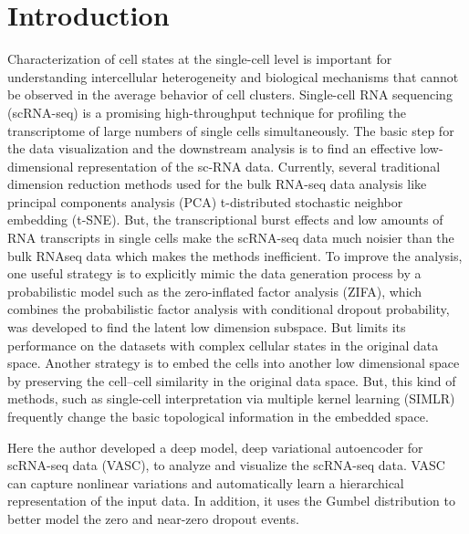 \documentclass[12 pts]{article}
\begin{document}



\tableofcontents
\clearpage

\section{Introduction}
Characterization of cell states at the single-cell level is important for understanding intercellular heterogeneity and biological mechanisms that cannot be observed in the average behavior of cell clusters. Single-cell RNA sequencing (scRNA-seq) is a promising high-throughput technique for profiling the transcriptome of large numbers of single cells simultaneously. The basic step for the data visualization and the downstream analysis is to find an effective low-dimensional representation of the sc-RNA data. Currently, several traditional dimension reduction methods used for the bulk RNA-seq data analysis like principal components analysis (PCA) t-distributed stochastic neighbor embedding (t-SNE). But, the transcriptional burst effects and low amounts of RNA transcripts in single cells make the scRNA-seq data much noisier than the bulk RNAseq data which makes the methods inefficient. To improve the analysis, one useful strategy is to explicitly mimic the data generation process by a probabilistic model such as the zero-inflated factor analysis (ZIFA), which combines the probabilistic factor analysis with conditional dropout probability, was developed to find the latent low dimension subspace. But limits its performance on the datasets with complex cellular states in the original data space. Another strategy is to embed the cells into another low dimensional space by preserving the cell–cell similarity in the original data space. But, this kind of methods, such as single-cell interpretation via multiple kernel learning (SIMLR) frequently change the basic topological information in the embedded space. 

Here the author developed a deep model, deep variational autoencoder for scRNA-seq data (VASC), to analyze and visualize the scRNA-seq data. VASC can capture nonlinear variations and automatically learn a hierarchical representation of the input data. In addition, it uses the Gumbel distribution to better model the zero and near-zero dropout events.
\end{document}
